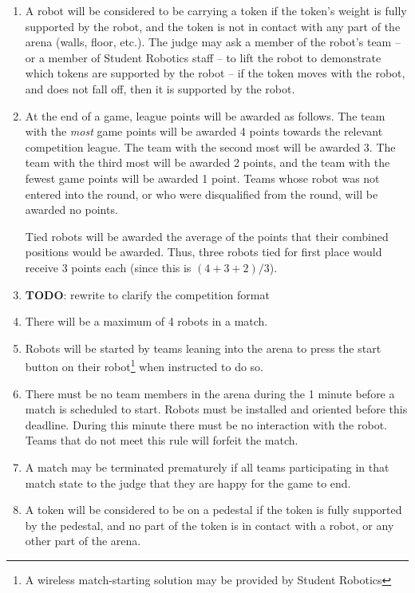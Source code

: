 \begin{enumerate}
\begin{itemize}
\end{itemize}

\item A robot will be considered to be carrying a token if the token's weight is fully supported by the robot, and the token is not in contact with any part of the arena (walls, floor, etc.).
      The judge may ask a member of the robot's team -- or a member of Student Robotics staff -- to lift the robot to demonstrate which tokens are supported by the robot -- if the token moves with the robot, and does not fall off, then it is supported by the robot.

\item At the end of a game, league points will be awarded as follows.
      The team with the \emph{most} game points will be awarded 4 points towards the relevant competition league.
      The team with the second most will be awarded 3.
      The team with the third most will be awarded 2 points, and the team with the fewest game points will be awarded 1 point.
      Teams whose robot was not entered into the round, or who were disqualified from the round, will be awarded no points.

      Tied robots will be awarded the average of the points that their combined positions would be awarded.
      Thus, three robots tied for first place would receive 3 points each (since this is $(4+3+2)/3$).

\item \textbf{TODO}: rewrite to clarify the competition format

\item There will be a maximum of 4 robots in a match.
\item Robots will be started by teams leaning into the arena to press the start button on their robot\footnote{A wireless match-starting solution may be provided by Student Robotics} when instructed to do so.

\item There must be no team members in the arena during the 1 minute before a match is scheduled to start.
      Robots must be installed and oriented before this deadline.
      During this minute there must be no interaction with the robot.
      Teams that do not meet this rule will forfeit the match.

\item A match may be terminated prematurely if all teams participating in that match state to the judge that they are happy for the game to end.

\item A token will be considered to be on a pedestal if the token is fully supported by the pedestal, and no part of the token is in contact with a robot, or any other part of the arena.

\end{enumerate}
